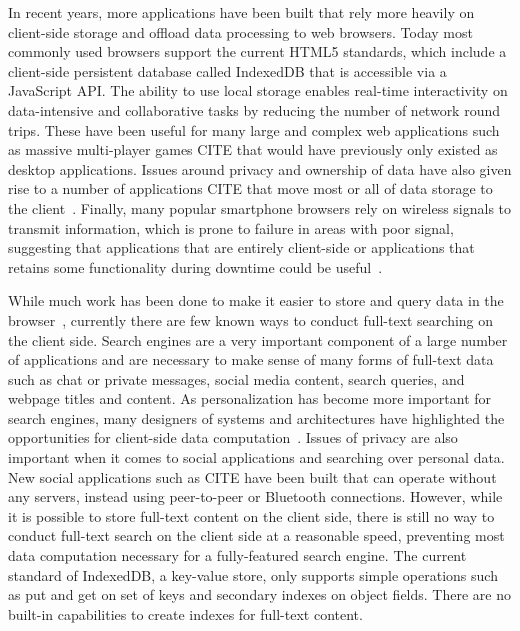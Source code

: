 \documentclass{vldb}
\begin{document}
In recent years, more applications have been built that rely more heavily on client-side storage and offload data processing to web browsers. Today most commonly used browsers support the current HTML5 standards, which include a client-side persistent database called IndexedDB that is accessible via a JavaScript API. 
The ability to use local storage enables real-time interactivity on data-intensive and collaborative tasks by reducing the number of network round trips.
These have been useful for many large and complex web applications such as massive multi-player games CITE that would have previously only existed as desktop applications.
Issues around privacy and ownership of data have also given rise to a number of applications CITE that move most or all of data storage to the client~\cite{bilenko2011predictive}. 
Finally, many popular smartphone browsers rely on wireless signals to transmit information, which is prone to failure in areas with poor signal, suggesting that applications that are entirely client-side or applications that retains some functionality during downtime could be useful~\cite{balasubramanian2012findall}.

While much work has been done to make it easier to store and query data in the browser~\cite{benson2010sync}, currently there are few known ways to conduct full-text searching on the client side. Search engines are a very important component of a large number of applications and are necessary to make sense of many forms of full-text data such as chat or private messages, social media content, search queries, and webpage titles and content. 
As personalization has become more important for search engines, many designers of systems and architectures have highlighted the opportunities for client-side data computation~\cite{bharat2000searchpad,teevan2005personalizing}.
Issues of privacy are also important when it comes to social applications and searching over personal data. New social applications such as CITE have been built that can operate without any servers, instead using peer-to-peer or Bluetooth connections.
However, while it is possible to store full-text content on the client side, there is still no way to conduct full-text search on the client side at a reasonable speed, preventing most data computation necessary for a fully-featured search engine.
The current standard of IndexedDB, a key-value store, only supports simple operations such as put and get on set of keys and secondary indexes on object fields. There are no built-in capabilities to create indexes for full-text content. 
\end{document}

